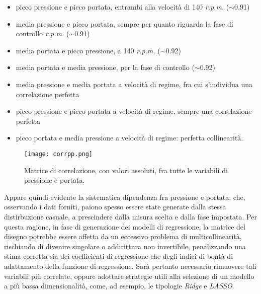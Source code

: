 \documentclass[fleqn,10pt]{SelfArx} %
\begin{document}
\begin{itemize}
    \item picco pressione e picco portata, entrambi alla velocità di 140 \textit{r.p.m.} ($\sim$0.91)
    \item media pressione e picco portata, sempre per quanto riguarda la fase di controllo \textit{r.p.m.} ($\sim$0.91)
    \item media portata e picco pressione, a 140 \textit{r.p.m.} ($\sim$0.92)
    \item media portata e media pressione, per la fase di controllo ($\sim$0.92)
    \item media pressione e media portata a velocità di regime, fra cui s'individua una correlazione perfetta
    \item picco pressione e picco portata a velocità di regime, sempre una correlazione perfetta
    \item picco portata e media pressione a velocità di regime: perfetta collinearità.
\end{itemize}
\begin{figure}[H]
    \centering
    \texttt{[image: corrpp.png]}
    \label{fig:em}
    \caption{Matrice di correlazione, con valori assoluti, fra tutte le variabili di pressione e portata.}
\end{figure}
Appare quindi evidente la sistematica dipendenza fra pressione e portata, che, osservando i dati forniti, paiono spesso essere state generate dalla stessa distirbuzione casuale, a prescindere dalla misura scelta e dalla fase impostata. Per questa ragione, in fase di generazione dei modelli di regressione, la matrice del disegno potrebbe essere affetta da un eccessivo problema di multicollinearità, rischiando di divenire singolare o addirittura non invertibile, penalizzando una stima corretta sia dei coefficienti di regressione che degli indici di bontà di adattamento della funzione di regressione. Sarà pertanto necessario rimuovere tali variabili più correlate, oppure adottare strategie utili alla selezione di un modello a più bassa dimensionalità, come, ad esempio, le tipologie \textit{Ridge} e \textit{LASSO}.
\end{document}
